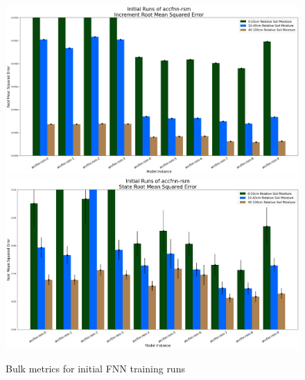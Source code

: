 \begin{figure}[hp!]
    \includegraphics[width=.48\linewidth,draft=false]{figures/efficiency_initial-best/eval_test_efficiency_initial-accfnn-rsm_mse_res.png}
    \includegraphics[width=.48\linewidth,draft=false]{figures/efficiency_initial-best/eval_test_efficiency_initial-accfnn-rsm_mse_state.png}

    \caption{Bulk metrics for initial FNN training runs}
    \label{model-init-fnn}
\end{figure}

